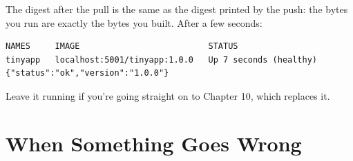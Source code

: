 
The digest after the pull is the same as the digest printed by the push: the bytes you run are exactly the bytes you built. After a few seconds:

\begin{codeblock}

\begin{Shaded}
\begin{Highlighting}[]
 
\end{Highlighting}
\end{Shaded}

\end{codeblock}

\begin{codeblock}
\begin{Verbatim}[formatcom=\outputstyle]
NAMES     IMAGE                          STATUS
tinyapp   localhost:5001/tinyapp:1.0.0   Up 7 seconds (healthy)
{"status":"ok","version":"1.0.0"}
\end{Verbatim}
\end{codeblock}

Leave it running if you're going straight on to Chapter 10, which replaces it.


\section{When Something Goes Wrong}\label{09-lab-ship-a-small-python-app-in-a-container:when-something-goes-wrong}

